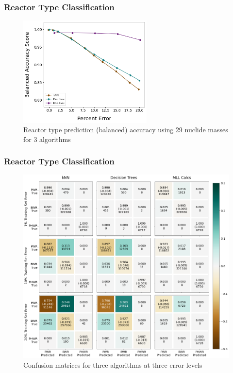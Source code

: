\begin{frame}
  \frametitle{Reactor Type Classification}
    \begin{figure}
      \centering
      \includegraphics[width=0.6\textwidth]{./figures/randerr_compare_nuc29_BalAcc_rxtr.png}
      \caption{Reactor type prediction (balanced) accuracy using 29 nuclide masses for 3 algorithms}
    \end{figure}
\end{frame}

\begin{frame}
  \frametitle{Reactor Type Classification}
    \begin{figure}
      \centering
      \includegraphics[height=0.75\textheight]{./figures/confusion_matrix_nuc29_3errs.png}
      \caption{Confusion matrices for three algorithms at three error levels}
    \end{figure}
\end{frame}

